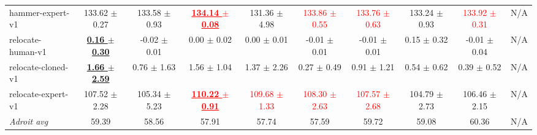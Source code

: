\documentclass[a4paper]{article}
\begin{document}
\begin{table}[t]
{\begin{tabular}{lccccccccc}
    hammer-expert-v1 & 133.62 $\pm$ 0.27 & 133.58 $\pm$ 0.93 & \textcolor{red}{\textbf{\underline{134.14 $\pm$ 0.08}}} & 131.36 $\pm$ 4.98 & \textcolor{red}{133.86 $\pm$ 0.55} & \textcolor{red}{133.76 $\pm$ 0.63} & 133.24 $\pm$ 0.93 & \textcolor{red}{133.92 $\pm$ 0.31} & N/A \\
    relocate-human-v1 & \textbf{\underline{0.16 $\pm$ 0.30}} & -0.02 $\pm$ 0.01 & 0.00 $\pm$ 0.02 & 0.00 $\pm$ 0.01 & -0.01 $\pm$ 0.01 & -0.01 $\pm$ 0.01 & 0.15 $\pm$ 0.32 & -0.01 $\pm$ 0.04 & N/A \\
    relocate-cloned-v1 & \textbf{\underline{1.66 $\pm$ 2.59}} & 0.76 $\pm$ 1.63 & 1.56 $\pm$ 1.04 & 1.37 $\pm$ 2.26 & 0.27 $\pm$ 0.49 & 0.91 $\pm$ 1.21 & 0.54 $\pm$ 0.62 & 0.39 $\pm$ 0.52 & N/A \\
    relocate-expert-v1 & 107.52 $\pm$ 2.28 & 105.34 $\pm$ 5.23 & \textcolor{red}{\textbf{\underline{110.22 $\pm$ 0.91}}} & \textcolor{red}{109.68 $\pm$ 1.33} & \textcolor{red}{108.30 $\pm$ 2.63} & \textcolor{red}{107.57 $\pm$ 2.68} & 104.79 $\pm$ 2.73 & 106.46 $\pm$ 2.15 & N/A \\
    \midrule
    \textit{Adroit avg} & 59.39 & 58.56 & 57.91 & 57.74 & 57.59 & 59.72 & 59.08 & 60.36 & N/A \\
    \bottomrule
  \end{tabular}
  }
\end{table}
\end{document}
